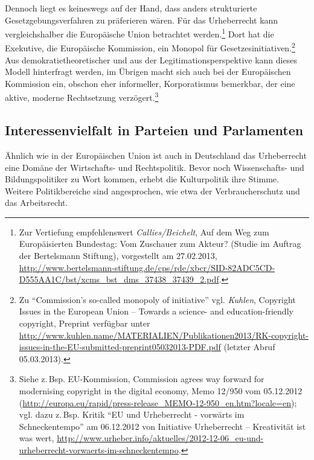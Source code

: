 \documentclass[output=paper]{langscibook}
\begin{document}
Dennoch liegt es keineswegs auf der Hand, dass anders strukturierte
Gesetzgebungsverfahren zu präferieren wären. Für das Urheberrecht kann
vergleichshalber die Europäische Union betrachtet werden.\footnote{Zur
  Vertiefung empfehlenswert \emph{Callies/Beichelt}, Auf dem Weg zum
  Europäisierten Bundestag: Vom Zuschauer zum Akteur? (Studie im Auftrag
  der Bertelsmann Stiftung), vorgestellt am 27.02.2013,
  \url{http://www.bertelsmann-stiftung.de/cps/rde/xbcr/SID-82ADC5CD-D555AA1C/bst/xcms_bst_dms_37438_37439_2.pdf}.}
Dort hat die Exekutive, die Europäische Kommission, ein Monopol für
Gesetzesinitiativen.\footnote{Zu \enquote{Commission's so-called
  monopoly of initiative} vgl. \emph{Kuhlen}, Copyright Issues in the
  European Union -- Towards a science- and education-friendly copyright,
  Preprint verfügbar unter
  \url{http://www.kuhlen.name/MATERIALIEN/Publikationen2013/RK-copyright-issues-in-the-EU-submitted-preprint05032013-PDF.pdf}
  (letzter Abruf 05.03.2013).} Aus demokratietheoretischer und aus der
Legitimationsperspektive kann dieses Modell hinterfragt werden, im
Übrigen macht sich auch bei der Europäischen Kommission ein, obschon
eher informeller, Korporatismus bemerkbar, der eine aktive, moderne
Rechtsetzung verzögert.\footnote{Siehe z.\,Bsp. EU-Kommission, Commission
  agrees way forward for modernising copyright in the digital economy,
  Memo 12/950 vom 05.12.2012
  (\url{http://europa.eu/rapid/press-release_MEMO-12-950_en.htm?locale=en});
  vgl. dazu z.\,Bsp. Kritik \enquote{EU und Urheberrecht - vorwärts im
  Schneckentempo} am 06.12.2012 von Initiative Urheberrecht --
  Kreativität ist was wert,
  \url{http://www.urheber.info/aktuelles/2012-12-06_eu-und-urheberrecht-vorwaerts-im-schneckentempo}.}

\hypertarget{interessenvielfalt-in-parteien-und-parlamenten}{%
\subsection{Interessenvielfalt in Parteien und
Parlamenten}\label{interessenvielfalt-in-parteien-und-parlamenten}}

Ähnlich wie in der Europäischen Union ist auch in Deutschland das
Urheberrecht eine Domäne der Wirtschafts- und Rechtspolitik. Bevor noch
Wissenschafts- und Bildungspolitiker zu Wort kommen, erhebt die
Kulturpolitik ihre Stimme. Weitere Politikbereiche sind angesprochen,
wie etwa der Verbraucherschutz und das Arbeitsrecht.
\end{document}
